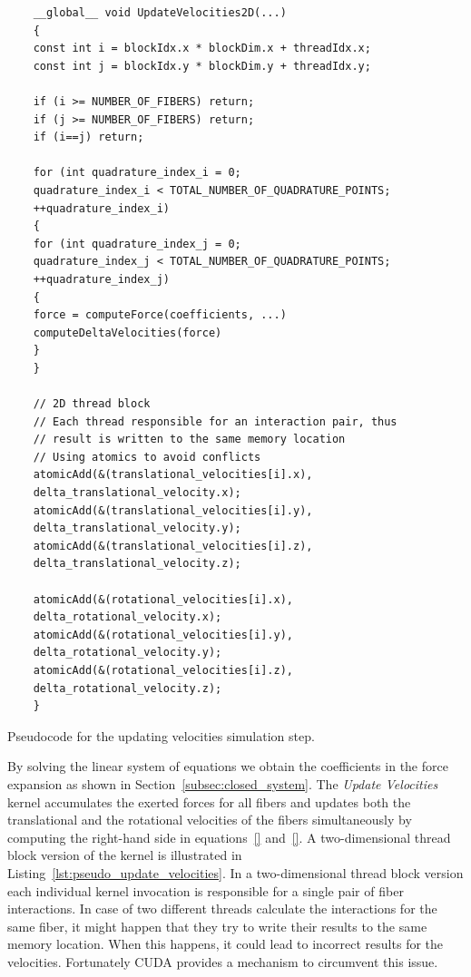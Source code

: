 \begin{listing}[!htbp]
  \centering
  \begin{verbatim}
    __global__ void UpdateVelocities2D(...)
    {
    const int i = blockIdx.x * blockDim.x + threadIdx.x;
    const int j = blockIdx.y * blockDim.y + threadIdx.y;

    if (i >= NUMBER_OF_FIBERS) return;
    if (j >= NUMBER_OF_FIBERS) return;
    if (i==j) return;

    for (int quadrature_index_i = 0;
    quadrature_index_i < TOTAL_NUMBER_OF_QUADRATURE_POINTS;
    ++quadrature_index_i)
    {
    for (int quadrature_index_j = 0;
    quadrature_index_j < TOTAL_NUMBER_OF_QUADRATURE_POINTS;
    ++quadrature_index_j)
    {
    force = computeForce(coefficients, ...)
    computeDeltaVelocities(force)
    }
    }

    // 2D thread block
    // Each thread responsible for an interaction pair, thus
    // result is written to the same memory location
    // Using atomics to avoid conflicts
    atomicAdd(&(translational_velocities[i].x),
    delta_translational_velocity.x);
    atomicAdd(&(translational_velocities[i].y),
    delta_translational_velocity.y);
    atomicAdd(&(translational_velocities[i].z),
    delta_translational_velocity.z);

    atomicAdd(&(rotational_velocities[i].x),
    delta_rotational_velocity.x);
    atomicAdd(&(rotational_velocities[i].y),
    delta_rotational_velocity.y);
    atomicAdd(&(rotational_velocities[i].z),
    delta_rotational_velocity.z);
    }
  \end{verbatim}
  \caption{Pseudocode for the updating velocities simulation step.}
  \label{lst:pseudo_update_velocities}
\end{listing}

By solving the linear system of equations we obtain the coefficients in the force expansion as shown in Section~\ref{subsec:closed_system}. The \emph{Update Velocities} kernel accumulates the exerted forces for all fibers and updates both the translational and the rotational velocities of the fibers simultaneously by computing the right-hand side in equations~\eqref{} and~\eqref{}. A two-dimensional thread block version of the kernel is illustrated in Listing~\ref{lst:pseudo_update_velocities}. In a two-dimensional thread block version each individual kernel invocation is responsible for a single pair of fiber interactions. In case of two different threads calculate the interactions for the same fiber, it might happen that they try to write their results to the same memory location. When this happens, it could lead to incorrect results for the velocities. Fortunately CUDA provides a mechanism to circumvent this issue.

